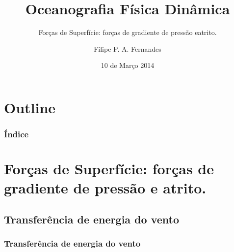 \title[Aula 04]{Oceanografia Física Dinâmica}
\subtitle{Forças de Superfície: forças de gradiente de pressão eatrito.}
\author[Filipe Fernandes]{Filipe P. A. Fernandes}
\date[Março 2014]{10 de Março 2014}




\begin{frame}[plain]
  \titlepage
\end{frame}

\section*{Outline}
\begin{frame}
\frametitle{Índice}
\tableofcontents
\end{frame}

\section{Forças de Superfície: forças de gradiente de pressão e atrito.}
\subsection{Transferência de energia do vento}
\begin{frame}
\frametitle{Transferência de energia do vento}
  \begin{center}
  \end{center}
\end{frame}



